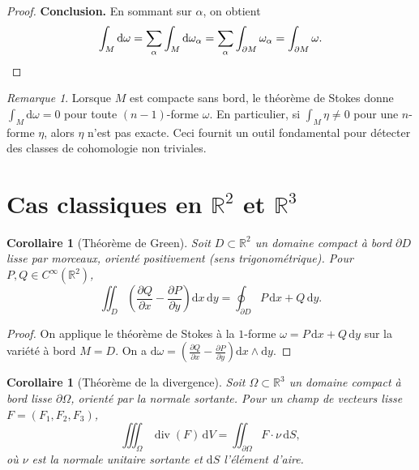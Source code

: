 \documentclass[12pt,a4paper,openany]{book}
\theoremstyle{definition}
\theoremstyle{plain}
\newtheorem{corollaire}[definition]{Corollaire}
\theoremstyle{remark}
\newtheorem{remarque}[definition]{Remarque}
\newcommand{\R}{\mathbb{R}}
\newcommand{\dd}{\mathrm{d}}
\begin{document}
\begin{proof}
\medskip\noindent\textbf{Conclusion.}
En sommant sur $\alpha$, on obtient
\[
  \int_M \dd\omega = \sum_\alpha \int_M \dd\omega_\alpha
  = \sum_\alpha \int_{\partial M} \omega_\alpha
  = \int_{\partial M} \omega. \qedhere
\]
\end{proof}

\begin{remarque}\label{rem:stokes-sans-bord}
Lorsque $M$ est compacte sans bord, le théorème de Stokes donne
$\int_M \dd\omega = 0$ pour toute $(n-1)$-forme $\omega$. En particulier,
si $\int_M \eta \neq 0$ pour une $n$-forme $\eta$, alors $\eta$ n'est pas
exacte. Ceci fournit un outil fondamental pour détecter des classes de
cohomologie non triviales.
\end{remarque}

\section{Cas classiques en $\R^2$ et $\R^3$}\label{sec:cas-classiques}

\begin{corollaire}[Théorème de Green]\label{cor:green}
Soit $D \subset \R^2$ un domaine compact à bord $\partial D$ lisse par morceaux,
orienté positivement (sens trigonométrique). Pour $P, Q \in C^\infty(\R^2)$,
\[
  \iint_D \left(\frac{\partial Q}{\partial x} - \frac{\partial P}{\partial y}\right)
  \dd x \, \dd y = \oint_{\partial D} P \, \dd x + Q \, \dd y.
\]
\end{corollaire}

\begin{proof}
On applique le théorème de Stokes à la $1$-forme $\omega = P \, \dd x + Q\, \dd y$
sur la variété à bord $M = D$. On a $\dd\omega = \left(\frac{\partial Q}{\partial x}
- \frac{\partial P}{\partial y}\right) \dd x \wedge \dd y$.
\end{proof}

\begin{corollaire}[Théorème de la divergence]\label{cor:divergence}
Soit $\Omega \subset \R^3$ un domaine compact à bord lisse $\partial\Omega$,
orienté par la normale sortante. Pour un champ de vecteurs lisse
$F = (F_1, F_2, F_3)$,
\[
  \iiint_\Omega \operatorname{div}(F) \, \dd V
  = \iint_{\partial\Omega} F \cdot \nu \, \dd S,
\]
où $\nu$ est la normale unitaire sortante et $\dd S$ l'élément d'aire.
\end{corollaire}
\end{document}
